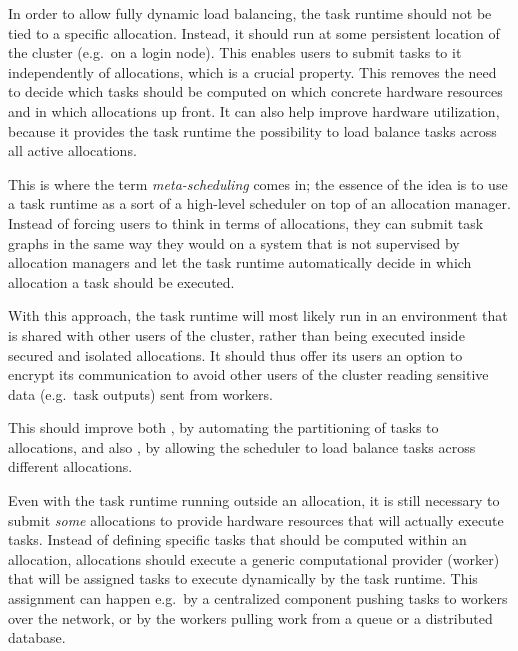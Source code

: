 \begin{description}[wide=0pt]
	\item[Task runtime runs outside of allocations] In order to allow fully dynamic load balancing, the task runtime should not be tied to a specific
		allocation. Instead, it should run at some persistent location of the cluster (e.g.\ on a login
		node). This enables users to submit tasks to it independently of allocations, which is a crucial
		property. This removes the need to decide which tasks should be computed on which concrete hardware
		resources and in which allocations up front. It can also help improve hardware utilization, because
		it provides the task runtime the possibility to load balance tasks across all active allocations.

		This is where the term \emph{meta-scheduling} comes in; the essence of the idea is to use a task
		runtime as a sort of a high-level scheduler on top of an allocation manager. Instead of forcing
		users to think in terms of allocations, they can submit task graphs in the same way they would on a
		system that is not supervised by allocation managers and let the task runtime automatically decide
		in which allocation a task should be executed.

		With this approach, the task runtime will most likely run in an environment that is shared with
		other users of the cluster, rather than being executed inside secured and isolated allocations. It
		should thus offer its users an option to encrypt its communication to avoid other users of the
		cluster reading sensitive data (e.g.\ task outputs) sent from workers.

		This should improve both \ergonomics{}, by automating the partitioning of tasks to
		allocations, and also \efficiency{}, by allowing the scheduler to load balance tasks
		across different allocations.
	\item[Allocations are uniform] Even with the task runtime running outside an allocation, it is still necessary to submit
		\emph{some} allocations to provide hardware resources that will actually execute tasks.
		Instead of defining specific tasks that should be computed within an allocation, allocations should
		execute a generic computational provider (worker) that will be assigned tasks to execute
		dynamically by the task runtime. This assignment can happen e.g.\ by a centralized component
		pushing tasks to workers over the network, or by the workers pulling work from a queue or a
		distributed database.


\end{description}
